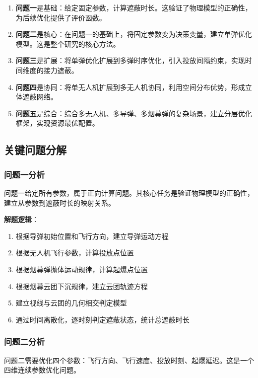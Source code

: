 \documentclass[12pt,a4paper]{article}
\begin{document}
\begin{enumerate}
    \item \textbf{问题一}是基础：给定固定参数，计算遮蔽时长。这验证了物理模型的正确性，为后续优化提供了评价函数。
    
    \item \textbf{问题二}是核心：在问题一的基础上，将固定参数变为决策变量，建立单弹优化模型。这是整个研究的核心方法。
    
    \item \textbf{问题三}是扩展：将单弹优化扩展到多弹时序优化，引入投放间隔约束，实现时间维度的接力遮蔽。
    
    \item \textbf{问题四}是协同：将单无人机扩展到多无人机协同，利用空间分布优势，形成立体遮蔽网络。
    
    \item \textbf{问题五}是综合：综合多无人机、多导弹、多烟幕弹的复杂场景，建立分层优化框架，实现资源最优配置。
\end{enumerate}

\subsection{关键问题分解}

\subsubsection{问题一分析}
问题一给定所有参数，属于正向计算问题。其核心任务是验证物理模型的正确性，建立从参数到遮蔽时长的映射关系。

\textbf{解题逻辑}：
\begin{enumerate}
    \item 根据导弹初始位置和飞行方向，建立导弹运动方程
    \item 根据无人机飞行参数，计算投放点位置
    \item 根据烟幕弹抛体运动规律，计算起爆点位置
    \item 根据烟幕云团下沉规律，建立云团轨迹方程
    \item 建立视线与云团的几何相交判定模型
    \item 通过时间离散化，逐时刻判定遮蔽状态，统计总遮蔽时长
\end{enumerate}

\subsubsection{问题二分析}
问题二需要优化四个参数：飞行方向、飞行速度、投放时刻、起爆延迟。这是一个四维连续参数优化问题。
\end{document}
